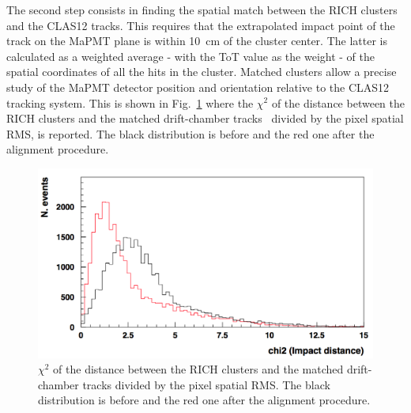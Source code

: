 \documentclass[5p,times,twocolumn]{elsarticle}
\def\MaPMT{MaPMT }
\begin{document}

The second step consists in finding the spatial match between the RICH clusters and the CLAS12 tracks. This requires
that the extrapolated impact point of the track on the MaPMT plane is within 10~cm of the cluster center. The latter
is calculated as a weighted average - with the ToT value as the weight - of the spatial coordinates of all the hits in the
cluster. Matched clusters allow a precise study of the MaPMT detector position and orientation relative to the CLAS12
tracking system. This is shown in Fig.~\ref{Fig:DCmatch} where the $\chi^2$ of the distance between the RICH
clusters and the matched drift-chamber tracks~\cite{dc-nim} divided by the pixel spatial RMS, is reported. The black
distribution is before and the red one after the alignment procedure.

\begin{figure}[t]
\begin{center}
\includegraphics[width=1.0\columnwidth]{ckmaca.png}
\end{center}
\caption{$\chi^2$ of the distance between the RICH clusters and the matched drift-chamber tracks divided by the
  pixel spatial RMS. The black distribution is before and the red one after the alignment procedure.}
\label{Fig:DCmatch}
\end{figure}
\end{document}
